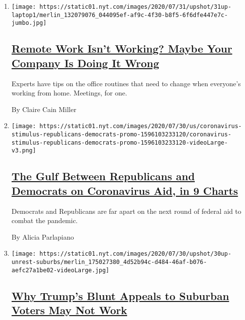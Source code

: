 \begin{enumerate}
\def\labelenumi{\arabic{enumi}.}
\item
  \texttt{[image: https://static01.nyt.com/images/2020/07/31/upshot/31up-laptop1/merlin\_132079076\_044095ef-af9c-4f30-b8f5-6f6dfe447e7c-jumbo.jpg]}

  \hypertarget{remote-work-isnt-working-maybe-your-company-is-doing-it-wrong}{%
  \subsection{\texorpdfstring{\href{/2020/07/31/upshot/remote-work-tips.html}{Remote
  Work Isn't Working? Maybe Your Company Is Doing It
  Wrong}}{Remote Work Isn't Working? Maybe Your Company Is Doing It Wrong}}\label{remote-work-isnt-working-maybe-your-company-is-doing-it-wrong}}

  Experts have tips on the office routines that need to change when
  everyone's working from home. Meetings, for one.

  By Claire Cain Miller
\item
  \texttt{[image: https://static01.nyt.com/images/2020/07/30/us/coronavirus-stimulus-republicans-democrats-promo-1596103233120/coronavirus-stimulus-republicans-democrats-promo-1596103233120-videoLarge-v3.png]}

  \hypertarget{the-gulf-between-republicans-and-democrats-on-coronavirus-aid-in-9-charts}{%
  \subsection{\texorpdfstring{\href{/interactive/2020/07/30/upshot/coronavirus-stimulus-bill.html}{The
  Gulf Between Republicans and Democrats on Coronavirus Aid, in 9
  Charts}}{The Gulf Between Republicans and Democrats on Coronavirus Aid, in 9 Charts}}\label{the-gulf-between-republicans-and-democrats-on-coronavirus-aid-in-9-charts}}

  Democrats and Republicans are far apart on the next round of federal
  aid to combat the pandemic.

  By Alicia Parlapiano
\item
  \texttt{[image: https://static01.nyt.com/images/2020/07/30/upshot/30up-unrest-suburbs/merlin\_175027380\_4d52b94c-d484-46af-b076-aefc27a1be02-videoLarge.jpg]}

  \hypertarget{why-trumps-blunt-appeals-to-suburban-voters-may-not-work}{%
  \subsection{\texorpdfstring{\href{/2020/07/30/upshot/trump-suburban-voters.html}{Why
  Trump's Blunt Appeals to Suburban Voters May Not
  Work}}{Why Trump's Blunt Appeals to Suburban Voters May Not Work}}\label{why-trumps-blunt-appeals-to-suburban-voters-may-not-work}}


\end{enumerate}

